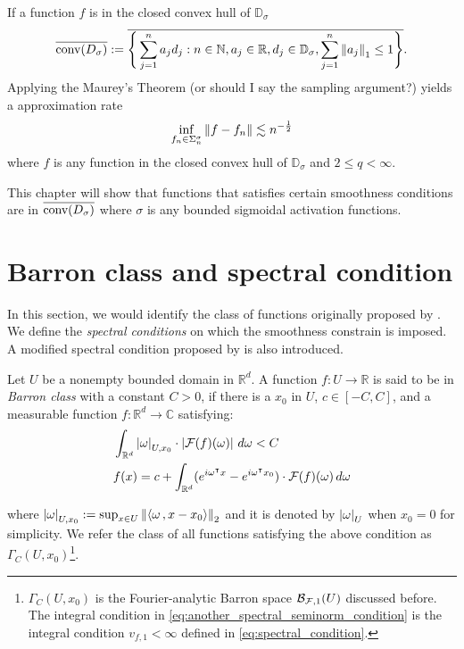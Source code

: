 If a function $f$ is in the closed convex hull of $\mathbb{D}_{\sigma}$
\begin{equation}
    \overline{\textnormal{conv}(D_{\sigma})} :=
    \overline{
        \Bigg\{ 
            \sum_{j=1}^n a_j d_j: 
            n\in\mathbb{N}, a_j\in\mathbb{R}, d_j\in\mathbb{D}_{\sigma}, 
            \sum_{j=1}^n \left\| a_j \right\|_1 \leq 1
        \Bigg\}
    }.
\end{equation}
Applying the Maurey's Theorem (\TODO or should I say the sampling argument?)
yields a approximation rate
\begin{equation}
    \inf_{f_n\in\Sigma_n^{\sigma}} \left\| f - f_n \right\| 
    \lesssim n^{-\frac{1}{2}}
\end{equation}
where $f$ is any function in the closed convex hull of $\mathbb{D}_{\sigma}$
and $2 \leq q < \infty$.

This chapter will show that functions that satisfies certain smoothness
conditions are in $\overline{\textnormal{conv}(D_{\sigma})}$ where $\sigma$ is any bounded
sigmoidal activation functions.


\section{Barron class and spectral condition}

In this section, we would identify the class of functions originally proposed by
\cite{barronUniversalApproximationBounds1993}. We define the \textit{spectral
conditions} on which the smoothness constrain is imposed. A modified spectral
condition proposed by \cite{siegelCharacterizationVariationSpaces2022} is
also introduced.

\begin{definition}
    \label{def:barron_class}
    Let $U$ be a nonempty bounded domain in $\mathbb{R}^d$. A function $f: U \to
    \mathbb{R}$ is said to be in \textit{Barron class} with a constant $C > 0$,
    if there is a $x_0$ in $U$, $c \in [-C, C]$, and a measurable function $f:
    \mathbb{R}^d \to \mathbb{C}$ satisfying:
    \begin{align}
        & \int_{\mathbb{R}^d} \left| \omega \right|_{U, x_0} 
        \cdot \left| \mathcal{F}(f)(\omega) \right| \,d\omega < C 
        \label{eq:another_spectral_seminorm_condition} \\
        & f(x) = c + \int_{\mathbb{R}^d} (
            e^{i\omega{}^{\intercal} x} - e^{i\omega{}^{\intercal} x_0}
        ) \cdot \mathcal{F}(f)(\omega)\,d\omega
    \end{align}

    where $\left| \omega \right|_{U, x_0} := \sup_{x\in U}\left\| \left\langle \omega\, , x - x_0 \right\rangle \right\|_2$
    and it is denoted by $\left| \omega \right|_U$ when $x_0 = 0$ for simplicity. We
    refer the class of all functions satisfying the above condition as 
    $\Gamma_C(U, x_0)$\footnote{
        $\Gamma_C(U, x_0)$ is the Fourier-analytic Barron space
        $\mathcal{B}_{\mathcal{F}, 1}(U)$ discussed before. The integral condition in
        \eqref{eq:another_spectral_seminorm_condition} is the integral condition
        $v_{f,1} < \infty$ defined in \eqref{eq:spectral_condition}.
    }.
\end{definition}

